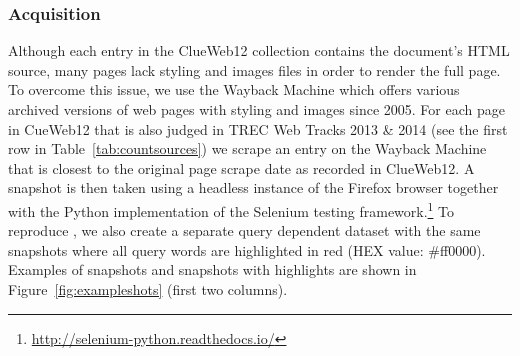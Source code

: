 

\subsubsection{Acquisition}
Although each entry in the ClueWeb12 collection contains the document's HTML source, many pages lack styling and images files in order to render the full page.
To overcome this issue, we use the Wayback Machine which offers various archived versions of web pages with styling and images since 2005.
For each page in CueWeb12 that is also judged in TREC Web Tracks 2013 \& 2014 (see the first row in Table~\ref{tab:countsources})
we scrape an entry on the Wayback Machine that is closest to the original page scrape date as recorded in ClueWeb12.
A snapshot is then taken using a headless instance of the Firefox browser together with the Python implementation of the Selenium testing framework.\footnote{\url{http://selenium-python.readthedocs.io/}}
To reproduce \cite{fan2017learning}, we also create a separate query dependent dataset with the same snapshots where all query words are highlighted in red (HEX value: \#ff0000).
Examples of snapshots and snapshots with highlights are shown in Figure~\ref{fig:exampleshots} (first two columns).

